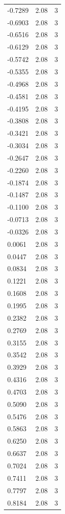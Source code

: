 \begin{longtable}{lrr}
  -0.7289 & 2.08 & 3 \\
  -0.6903 & 2.08 & 3 \\
  -0.6516 & 2.08 & 3 \\
  -0.6129 & 2.08 & 3 \\
  -0.5742 & 2.08 & 3 \\
  -0.5355 & 2.08 & 3 \\
  -0.4968 & 2.08 & 3 \\
  -0.4581 & 2.08 & 3 \\
  -0.4195 & 2.08 & 3 \\
  -0.3808 & 2.08 & 3 \\
  -0.3421 & 2.08 & 3 \\
  -0.3034 & 2.08 & 3 \\
  -0.2647 & 2.08 & 3 \\
  -0.2260 & 2.08 & 3 \\
  -0.1874 & 2.08 & 3 \\
  -0.1487 & 2.08 & 3 \\
  -0.1100 & 2.08 & 3 \\
  -0.0713 & 2.08 & 3 \\
  -0.0326 & 2.08 & 3 \\
  0.0061 & 2.08 & 3 \\
  0.0447 & 2.08 & 3 \\
  0.0834 & 2.08 & 3 \\
  0.1221 & 2.08 & 3 \\
  0.1608 & 2.08 & 3 \\
  0.1995 & 2.08 & 3 \\
  0.2382 & 2.08 & 3 \\
  0.2769 & 2.08 & 3 \\
  0.3155 & 2.08 & 3 \\
  0.3542 & 2.08 & 3 \\
  0.3929 & 2.08 & 3 \\
  0.4316 & 2.08 & 3 \\
  0.4703 & 2.08 & 3 \\
  0.5090 & 2.08 & 3 \\
  0.5476 & 2.08 & 3 \\
  0.5863 & 2.08 & 3 \\
  0.6250 & 2.08 & 3 \\
  0.6637 & 2.08 & 3 \\
  0.7024 & 2.08 & 3 \\
  0.7411 & 2.08 & 3 \\
  0.7797 & 2.08 & 3 \\
  0.8184 & 2.08 & 3 \\

\end{longtable}
